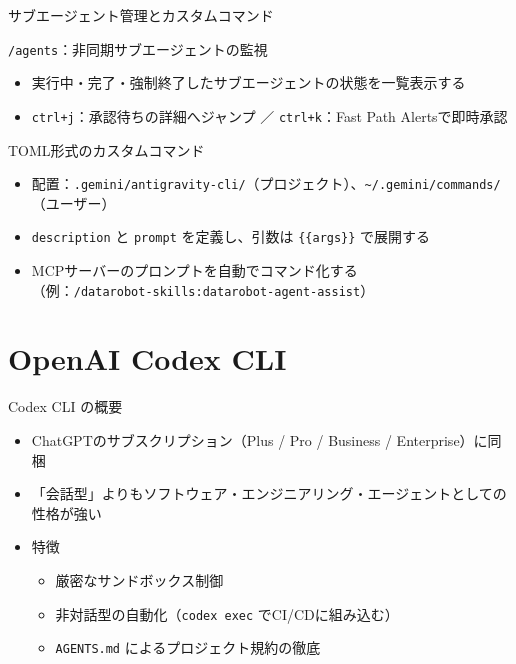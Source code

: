 \documentclass[aspectratio=169,11pt]{beamer}
\newcommand{\cmd}[1]{\texttt{#1}}
\newcommand{\home}{\textasciitilde}
\begin{document}
\begin{frame}{サブエージェント管理とカスタムコマンド}
  \begin{block}{\cmd{/agents}：非同期サブエージェントの監視\cite{r28}}
    \begin{itemize}
      \item 実行中・完了・強制終了したサブエージェントの状態を一覧表示する
      \item \cmd{ctrl+j}：承認待ちの詳細へジャンプ ／ \cmd{ctrl+k}：Fast Path Alertsで即時承認
    \end{itemize}
  \end{block}
  \begin{block}{TOML形式のカスタムコマンド\cite{r18,r32}}
    \begin{itemize}
      \item 配置：\cmd{.gemini/antigravity-cli/}（プロジェクト）、\cmd{\home/.gemini/commands/}（ユーザー）
      \item \cmd{description} と \cmd{prompt} を定義し、引数は \cmd{\{\{args\}\}} で展開する
      \item MCPサーバーのプロンプトを自動でコマンド化する\\（例：\cmd{/datarobot-skills:datarobot-agent-assist}\cite{r24}）
    \end{itemize}
  \end{block}
\end{frame}

\section{OpenAI Codex CLI}

\begin{frame}{Codex CLI の概要}
  \begin{itemize}
    \item ChatGPTのサブスクリプション（Plus / Pro / Business / Enterprise）に同梱\cite{r18}
    \item 「会話型」よりも\alert{ソフトウェア・エンジニアリング・エージェント}としての性格が強い
    \item 特徴
      \begin{itemize}
        \item 厳密なサンドボックス制御
        \item 非対話型の自動化（\cmd{codex exec} でCI/CDに組み込む）
        \item \cmd{AGENTS.md} によるプロジェクト規約の徹底
      \end{itemize}
  \end{itemize}
\end{frame}
\end{document}
